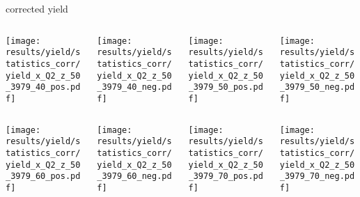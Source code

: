 \begin{frame}{corrected yield}
\begin{columns}
\begin{column}[T]{0.25\textwidth}
\texttt{[image: results/yield/statistics\_corr/yield\_x\_Q2\_z\_50\_3979\_40\_pos.pdf]}
\end{column}
\begin{column}[T]{0.25\textwidth}
\texttt{[image: results/yield/statistics\_corr/yield\_x\_Q2\_z\_50\_3979\_40\_neg.pdf]}
\end{column}
\begin{column}[T]{0.25\textwidth}
\texttt{[image: results/yield/statistics\_corr/yield\_x\_Q2\_z\_50\_3979\_50\_pos.pdf]}
\end{column}
\begin{column}[T]{0.25\textwidth}
\texttt{[image: results/yield/statistics\_corr/yield\_x\_Q2\_z\_50\_3979\_50\_neg.pdf]}
\end{column}
\end{columns}
\begin{columns}
\begin{column}[T]{0.25\textwidth}
\texttt{[image: results/yield/statistics\_corr/yield\_x\_Q2\_z\_50\_3979\_60\_pos.pdf]}
\end{column}
\begin{column}[T]{0.25\textwidth}
\texttt{[image: results/yield/statistics\_corr/yield\_x\_Q2\_z\_50\_3979\_60\_neg.pdf]}
\end{column}
\begin{column}[T]{0.25\textwidth}
\texttt{[image: results/yield/statistics\_corr/yield\_x\_Q2\_z\_50\_3979\_70\_pos.pdf]}
\end{column}
\begin{column}[T]{0.25\textwidth}
\texttt{[image: results/yield/statistics\_corr/yield\_x\_Q2\_z\_50\_3979\_70\_neg.pdf]}
\end{column}
\end{columns}
\end{frame}
